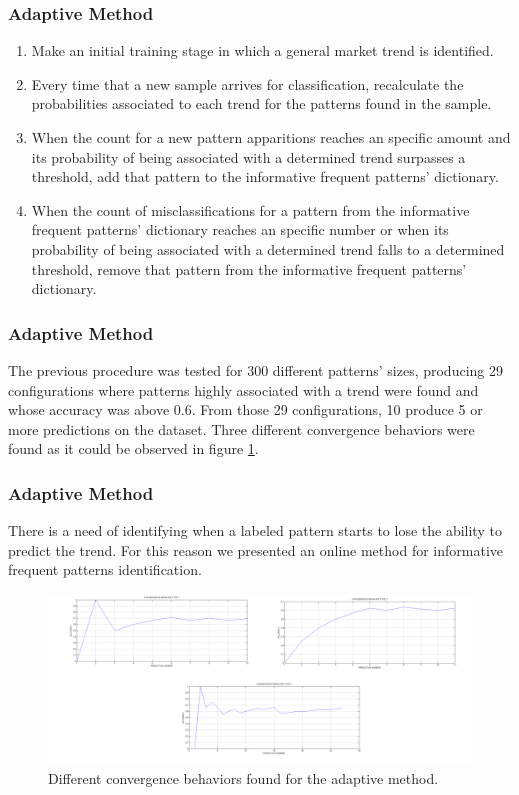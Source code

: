 \documentclass{beamer}
\begin{document}
\begin{frame}
\frametitle{Adaptive Method}

\begin{enumerate}
	\item \small Make an initial training stage in which a general market trend is identified.
  \item \small Every time that a new sample arrives for classification, recalculate the probabilities associated to each trend for the patterns found in the sample.
  \item \small When the count for a new pattern apparitions reaches an specific amount and its probability of being associated with a determined trend surpasses a threshold, add that pattern to the informative frequent patterns' dictionary.
  \item \small When the count of misclassifications for a pattern from the informative frequent patterns' dictionary reaches an specific number or when its probability of being associated with a determined trend falls to a determined threshold, remove that pattern from the informative frequent patterns' dictionary.
\end{enumerate}
\end{frame}

\begin{frame}
\frametitle{Adaptive Method}
\small The previous procedure was tested for 300 different patterns' sizes, producing  29 configurations where patterns highly associated with a trend were found and whose accuracy was above 0.6. From those 29 configurations, 10 produce 5 or more predictions on the dataset. Three different convergence behaviors were found as it could be observed in figure \ref{fig:Adaptive}.
\end{frame}


\begin{frame}
\frametitle{Adaptive Method}

There is a need of identifying when a labeled pattern starts to lose the ability to predict the trend. For this reason we presented an online method for informative frequent patterns identification.

\begin{figure}
	\centering
		\includegraphics[scale=0.10]{Adaptive.png}
		\caption{Different convergence behaviors found for the adaptive method.}
	\label{fig:Adaptive}
\end{figure}
\end{frame}
\end{document}
